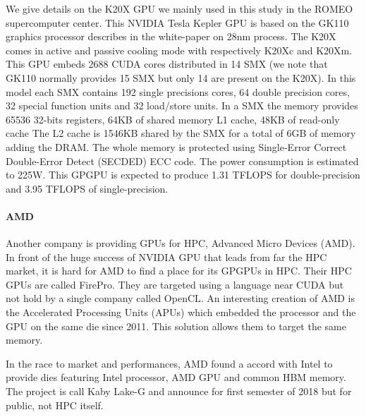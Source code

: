 We give details on the K20X GPU we mainly used in this study in the ROMEO supercomputer center. 
This NVIDIA Tesla Kepler GPU is based on the GK110 graphics processor describes in the white-paper\cite{nvidia2012nvidias} on 28nm process.
The K20X comes in active and passive cooling mode with respectively K20Xc and K20Xm.
This GPU embeds 2688 CUDA cores distributed in 14 SMX (we note that GK110 normally provides 15 SMX but only 14 are present  on the K20X).
In this model each SMX contains 192 single precisions cores, 64 double precision cores, 32 special function units and 32 load/store units.
In a SMX the memory provides 65536 32-bits registers, 64KB of shared memory L1 cache, 48KB of read-only cache
The L2 cache is 1546KB shared by the SMX for a total of 6GB of memory adding the DRAM.
The whole memory is protected using Single‐Error Correct Double‐Error Detect (SECDED) ECC code.
The power consumption is estimated to 225W.
This GPGPU is expected to produce 1.31 TFLOPS for double-precision and 3.95 TFLOPS of single-precision.

\paragraph{AMD}
Another company is providing GPUs for HPC, Advanced Micro Devices (AMD). 
In front of the huge success of NVIDIA GPU that leads from far the HPC market, it is hard for AMD to find a place for its GPGPUs in HPC. 
Their HPC GPUs are called FirePro.
They are targeted using a language near CUDA but not hold by a single company called OpenCL. 
An interesting creation of AMD is the Accelerated Processing Units (APUs) which embedded the processor and the GPU on the same die since 2011. 
This solution allows them to target the same memory. 

In the race to market and performances, AMD found a accord with Intel to provide dies featuring Intel processor, AMD GPU and common HBM memory. 
The project is call  Kaby Lake-G and announce for first semester of 2018 but for public, not HPC itself. 

